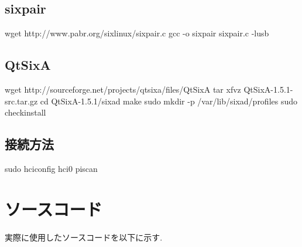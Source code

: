 \documentclass[12pt,oneside]{sotsuken_paper}
\begin{document}
\subsection{sixpair}
wget http://www.pabr.org/sixlinux/sixpair.c
gcc -o sixpair sixpair.c -lusb

\subsection{QtSixA}
wget http://sourceforge.net/projects/qtsixa/files/QtSixA%
tar xfvz QtSixA-1.5.1-src.tar.gz
cd QtSixA-1.5.1/sixad
make
sudo mkdir -p /var/lib/sixad/profiles
sudo checkinstall

\subsection{接続方法}
sudo hciconfig hci0 piscan

\section{ソースコード}
実際に使用したソースコードを以下に示す.
\end{document}
